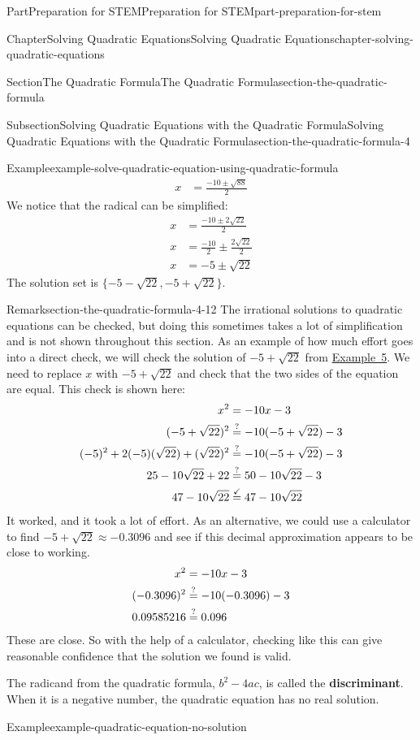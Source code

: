 \documentclass[twoside,10pt,]{book}
\newcommand{\terminology}[1]{\textbf{#1}}
\numberwithin{equation}{section}
\newcommand{\substitute}[1]{{\color{blue}{{#1}}}}
\newcommand{\confirm}[1]{\stackrel{\checkmark}{#1}}
\newcommand{\wonder}[1]{\stackrel{\text{?}}{#1}}
\newcommand{\amp}{&}
\begin{document}
\begin{partptx}{Part}{Preparation for STEM}{}{Preparation for STEM}{}{}{part-preparation-for-stem}
\begin{chapterptx}{Chapter}{Solving Quadratic Equations}{}{Solving Quadratic Equations}{}{}{chapter-solving-quadratic-equations}
\begin{sectionptx}{Section}{The Quadratic Formula}{}{The Quadratic Formula}{}{}{section-the-quadratic-formula}
\begin{subsectionptx}{Subsection}{Solving Quadratic Equations with the Quadratic Formula}{}{Solving Quadratic Equations with the Quadratic Formula}{}{}{section-the-quadratic-formula-4}
\begin{example}{Example}{}{example-solve-quadratic-equation-using-quadratic-formula}
{\begin{align*}
x\amp=\frac{-10\pm\sqrt{88}}{2}
\end{align*}
We notice that the radical can be simplified:%
\begin{align*}
x\amp=\frac{-10\pm2\sqrt{22}}{2}\\
x\amp=\frac{-10}{2}\pm\frac{2\sqrt{22}}{2}\\
x\amp=-5\pm\sqrt{22}
\end{align*}
The solution set is \(\{-5-\sqrt{22}, -5+\sqrt{22}\}\).%
}\end{example}
\begin{remark}{Remark}{}{section-the-quadratic-formula-4-12}%
The irrational solutions to quadratic equations can be checked, but doing this sometimes takes a lot of simplification and is not shown throughout this section. As an example of how much effort goes into a direct check, we will check the solution of \(-5+\sqrt{22}\) from \hyperref[example-solve-quadratic-equation-using-quadratic-formula]{Example~5}. We need to replace \(x\) with \(-5+\sqrt{22}\) and check that the two sides of the equation are equal. This check is shown here:%
\begin{align*}
x^2\amp=-10x-3\\
(\substitute{-5+\sqrt{22}})^2\amp\wonder{=}-10(\substitute{-5+\sqrt{22}})-3\\
(-5)^2+2(-5)(\sqrt{22})+(\sqrt{22})^2\amp\wonder{=}-10(-5+\sqrt{22})-3\\
25-10\sqrt{22}+22 \amp\wonder{=}50-10\sqrt{22}-3\\
47-10\sqrt{22}\amp\confirm{=}47-10\sqrt{22}
\end{align*}
It worked, and it took a lot of effort. As an alternative, we could use a calculator to find \(-5+\sqrt{22}\approx-0.3096\) and see if this decimal approximation appears to be close to working.%
\begin{align*}
x^2\amp=-10x-3\\
(\substitute{-0.3096})^2\amp\wonder{=}-10(\substitute{-0.3096})-3\\
0.09585216\amp\wonder{=}0.096
\end{align*}
These are close. So with the help of a calculator, checking like this can give reasonable confidence that the solution we found is valid.%
\end{remark}
The radicand from the quadratic formula, \(b^2-4ac\), is called the \terminology{discriminant}. When it is a negative number, the quadratic equation has no real              solution.%
\begin{example}{Example}{}{example-quadratic-equation-no-solution}%

\end{example}
\end{subsectionptx}
\end{sectionptx}
\end{chapterptx}
\end{partptx}
\end{document}
